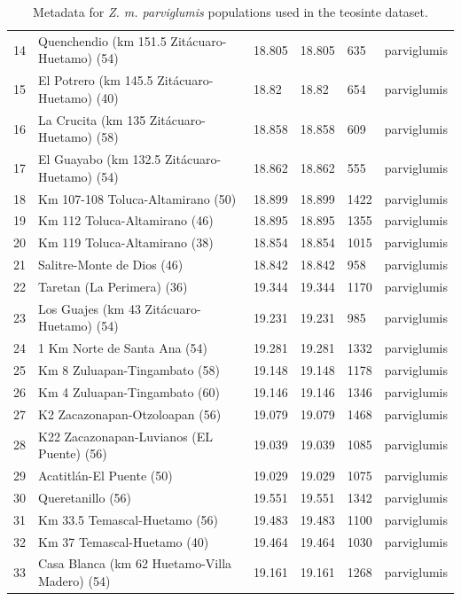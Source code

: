 \begin{table}
\begin{center}
{\begin{tabular}{r@{--}lllll}
14 & Quenchendio (km 151.5 Zit\'acuaro-Huetamo) (54) & 18.805 & 18.805 & 635 & parviglumis \\ 
15 & El Potrero (km 145.5 Zit\'acuaro-Huetamo) (40) & 18.82 & 18.82 & 654 & parviglumis \\ 
16 & La Crucita (km 135 Zit\'acuaro-Huetamo) (58) & 18.858 & 18.858 & 609 & parviglumis \\ 
17 & El Guayabo (km 132.5 Zit\'acuaro-Huetamo) (54) & 18.862 & 18.862 & 555 & parviglumis \\ 
18 & Km 107-108 Toluca-Altamirano (50) & 18.899 & 18.899 & 1422 & parviglumis \\ 
19 & Km 112 Toluca-Altamirano (46) & 18.895 & 18.895 & 1355 & parviglumis \\ 
20 & Km 119 Toluca-Altamirano (38) & 18.854 & 18.854 & 1015 & parviglumis \\ 
21 & Salitre-Monte de Dios (46) & 18.842 & 18.842 & 958 & parviglumis \\ 
22 & Taretan (La Perimera) (36) & 19.344 & 19.344 & 1170 & parviglumis \\ 
23 & Los Guajes (km 43 Zit\'acuaro-Huetamo) (54) & 19.231 & 19.231 & 985 & parviglumis \\ 
24 & 1 Km Norte de Santa Ana (54) & 19.281 & 19.281 & 1332 & parviglumis \\ 
25 & Km 8 Zuluapan-Tingambato (58) & 19.148 & 19.148 & 1178 & parviglumis \\ 
26 & Km 4 Zuluapan-Tingambato (60) & 19.146 & 19.146 & 1346 & parviglumis \\ 
27 & K2 Zacazonapan-Otzoloapan (56) & 19.079 & 19.079 & 1468 & parviglumis \\ 
28 & K22 Zacazonapan-Luvianos (EL Puente) (56) & 19.039 & 19.039 & 1085 & parviglumis \\ 
29 & Acatitl\'an-El Puente (50) & 19.029 & 19.029 & 1075 & parviglumis \\ 
30 & Queretanillo (56) & 19.551 & 19.551 & 1342 & parviglumis \\ 
31 & Km 33.5 Temascal-Huetamo (56) & 19.483 & 19.483 & 1100 & parviglumis \\
32 & Km 37 Temascal-Huetamo (40) & 19.464 & 19.464 & 1030 & parviglumis \\ 
33 & Casa Blanca (km 62 Huetamo-Villa Madero) (54) & 19.161 & 19.161 & 1268 & parviglumis \\  
   \hline
\end{tabular}
}
\label{tab:zea_popdata1}
\end{center}
\caption{Metadata for \textit{Z. m. parviglumis} populations used in the teosinte dataset.}
\end{table}

